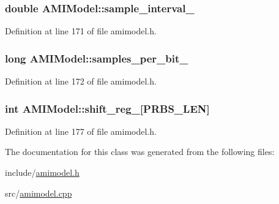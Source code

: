 \subsubsection[{sample\+\_\+interval\+\_\+}]{\setlength{\rightskip}{0pt plus 5cm}double A\+M\+I\+Model\+::sample\+\_\+interval\+\_\+\hspace{0.3cm}{\ttfamily [protected]}}\label{class_a_m_i_model_a4d4c286b04668c22f2e3f315715a6d5b}


Definition at line 171 of file amimodel.\+h.

\hypertarget{class_a_m_i_model_ac664a9c24d4fdc43ab15df7023ab04bc}{}
\subsubsection[{samples\+\_\+per\+\_\+bit\+\_\+}]{\setlength{\rightskip}{0pt plus 5cm}long A\+M\+I\+Model\+::samples\+\_\+per\+\_\+bit\+\_\+\hspace{0.3cm}{\ttfamily [protected]}}\label{class_a_m_i_model_ac664a9c24d4fdc43ab15df7023ab04bc}


Definition at line 172 of file amimodel.\+h.

\hypertarget{class_a_m_i_model_a68e4cdd12afbc4eb60dbefa4cce82a61}{}
\subsubsection[{shift\+\_\+reg\+\_\+}]{\setlength{\rightskip}{0pt plus 5cm}int A\+M\+I\+Model\+::shift\+\_\+reg\+\_\+\mbox{[}{\bf P\+R\+B\+S\+\_\+\+L\+E\+N}\mbox{]}\hspace{0.3cm}{\ttfamily [protected]}}\label{class_a_m_i_model_a68e4cdd12afbc4eb60dbefa4cce82a61}


Definition at line 177 of file amimodel.\+h.



The documentation for this class was generated from the following files\+:\begin{DoxyCompactItemize}
\item 
include/\hyperlink{amimodel_8h}{amimodel.\+h}\item 
src/\hyperlink{amimodel_8cpp}{amimodel.\+cpp}\end{DoxyCompactItemize}
